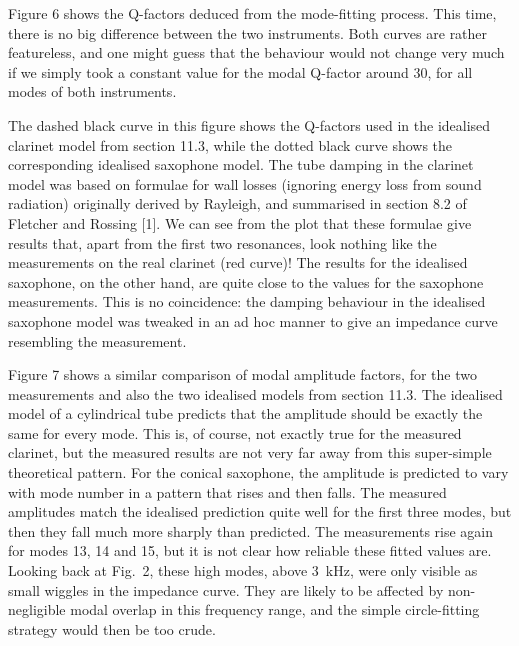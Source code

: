   Figure 6 shows the Q-factors deduced from the mode-fitting process. This 
  time, there is no big difference between the two instruments. Both curves are 
  rather featureless, and one might guess that the behaviour would not change 
  very much if we simply took a constant value for the modal Q-factor around 
  30, for all modes of both instruments. 

  The dashed black curve in this figure shows the Q-factors used in the 
  idealised clarinet model from section 11.3, while the dotted black curve 
  shows the corresponding idealised saxophone model. The tube damping in the 
  clarinet model was based on formulae for wall losses (ignoring energy loss 
  from sound radiation) originally derived by Rayleigh, and summarised in 
  section 8.2 of Fletcher and Rossing [1]. We can see from the plot that these 
  formulae give results that, apart from the first two resonances, look nothing 
  like the measurements on the real clarinet (red curve)! The results for the 
  idealised saxophone, on the other hand, are quite close to the values for the 
  saxophone measurements. This is no coincidence: the damping behaviour in the 
  idealised saxophone model was tweaked in an ad hoc manner to give an 
  impedance curve resembling the measurement. 

  Figure 7 shows a similar comparison of modal amplitude factors, for the two 
  measurements and also the two idealised models from section 11.3. The 
  idealised model of a cylindrical tube predicts that the amplitude should be 
  exactly the same for every mode. This is, of course, not exactly true for the 
  measured clarinet, but the measured results are not very far away from this 
  super-simple theoretical pattern. For the conical saxophone, the amplitude is 
  predicted to vary with mode number in a pattern that rises and then falls. 
  The measured amplitudes match the idealised prediction quite well for the 
  first three modes, but then they fall much more sharply than predicted. The 
  measurements rise again for modes 13, 14 and 15, but it is not clear how 
  reliable these fitted values are. Looking back at Fig.\ 2, these high modes, 
  above 3~kHz, were only visible as small wiggles in the impedance curve. They 
  are likely to be affected by non-negligible modal overlap in this frequency 
  range, and the simple circle-fitting strategy would then be too crude. 


